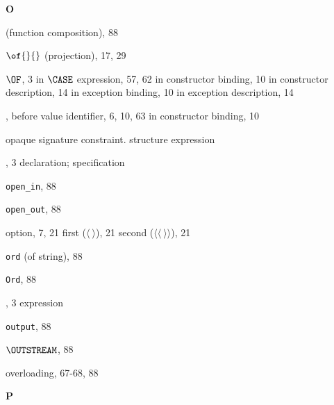 \begin{theindex}
\parbox{64mm}{\hfil{\large\bf O}\hfil}

\indexspace

\item {} (function composition), 88
\item $\of{}{}$ (projection), 17, 29
\item $\OF$, 3
\subitem in $\CASE$ expression, 57, 62
\subitem in constructor binding, 10
\subitem in constructor description, 14
\subitem in exception binding, 10
\subitem in exception description, 14
\item \OP,
\subitem before value identifier, 6, 10, 63
\subitem in constructor binding, 10
\item opaque signature constraint. \see structure expression
\item \OPEN, 3
\subitem \seealso declaration; specification
\item \verb+open_in+, 88
\item \verb+open_out+, 88
\item option, 7, 21
\subitem first ($\langle\ \rangle$), 21
\subitem second ($\langle\langle\ \rangle\rangle$), 21
\item {\tt ord} (of string), 88
\item {\tt Ord}, 88
\item \ORELSE, 3
\subitem \seealso expression
\item {\tt output}, 88
\item $\OUTSTREAM$, 88
\item overloading, 67-68, 88
\indexspace

\parbox{64mm}{\hfil{\large\bf P}\hfil}

\indexspace


\end{theindex}

